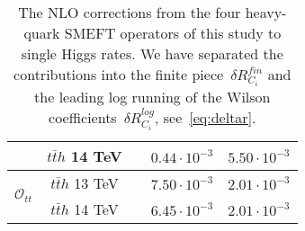 \begin{table}[t!]
{\begin{tabular}{c||cccc}
			 &   $t\bar t h$  {\color{Mahogany}  14 TeV }& & $0.44\cdot 10^{-3}$& $5.50\cdot 10^{-3}$\\        
			  \midrule	    	 
			 \multirow{2}{*}{{ \normalsize$\mathcal{O}_{tt}$}  }
			 &  $t\bar t h$ {\color{Mahogany}  13 TeV }& \mr{$m_t+\frac{m_h}{ 2}$}&  {$7.50\cdot 10^{-3}$} &$2.01\cdot 10^{-3}$\\	    
			 &   $t\bar t h$  {\color{Mahogany}  14 TeV }& & $6.45\cdot 10^{-3}$& $2.01\cdot 10^{-3}$\\                                           	
			\bottomrule
		\end{tabular}
	}
	\caption{The NLO corrections from the four heavy-quark SMEFT operators of this study to single Higgs rates. We have separated the contributions into the finite piece~$ \delta R_{C_i}^{fin}$ and the leading log running of the Wilson coefficients~$ \delta R_{C_i}^{log}$, see~\eqref{eq:deltar}. }
\label{table:res4top}
\end{table}


